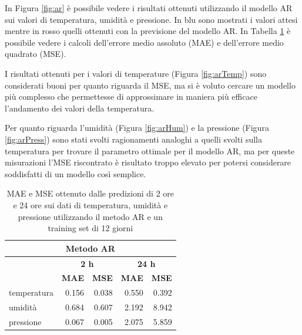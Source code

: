 \documentclass{article}
\begin{document}
In Figura \ref{fig:ar} è possibile vedere i risultati ottenuti utilizzando il modello AR sui valori di temperatura, umidità e pressione. In blu sono mostrati i valori attesi mentre in rosso quelli ottenuti con la previsione del modello AR. In Tabella \ref{tab:ar} è possibile vedere i calcoli dell'errore medio assoluto (MAE) e dell'errore medio quadrato (MSE).

I risultati ottenuti per i valori di temperature (Figura \ref{fig:arTemp}) sono considerati buoni per quanto riguarda il MSE, ma si è voluto cercare un modello più complesso che permettesse di approssimare in maniera più efficace l'andamento dei valori della temperatura.

Per quanto riguarda l'umidità (Figura \ref{fig:arHum}) e la pressione (Figura \ref{fig:arPress}) sono stati svolti ragionamenti analoghi a quelli svolti sulla temperatura per trovare il parametro ottimale per il modello AR, ma per queste misurazioni l'MSE riscontrato è risultato troppo elevato per potersi considerare soddisfatti di un modello così semplice.

\begin{table}
\centering
{}
\begin{tabular}{l|r|r|r|r}
\multicolumn{5}{c}{{\cellcolor[rgb]{0.875,0.875,0.875}} Metodo AR}\\ 
\hline
\rowcolor[rgb]{0.753,0.753,0.753}             
& \multicolumn{2}{c|}{\textbf{ 2 h}}              
& \multicolumn{2}{c}{\textbf{24 h }}\\ 
\rowcolor[rgb]{0.753,0.753,0.753}             & \multicolumn{1}{l}{\textbf{MAE}} & \textbf{MSE} & \multicolumn{1}{l|}{\textbf{MAE}} & \multicolumn{1}{c}{\textbf{MSE}}  \\ 
\hline
\rowcolor[rgb]{0.875,0.875,0.875} temperatura & 0.156                            & 0.038        & 0.550                             & 0.392                             \\
umidità                                       & 0.684                            & 0.607        & 2.192                             & 8.942                             \\
\rowcolor[rgb]{0.875,0.875,0.875} pressione   & 0.067                            & 0.005        & 2.075                             & 5.859                            
\end{tabular}
\caption{MAE e MSE ottenuto dalle predizioni di 2 ore e 24 ore sui dati di temperatura, umidità e pressione utilizzando il metodo AR e un training set di 12 giorni}
\label{tab:ar}
\end{table}
\end{document}
